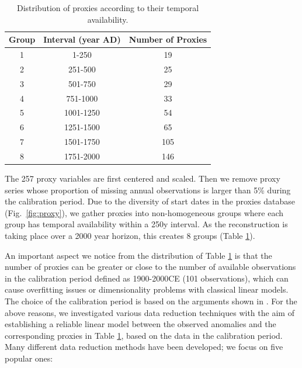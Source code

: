 \documentclass[12pt]{amsart}
\theoremstyle{plain}
\theoremstyle{definition}
\theoremstyle{remark}
\newcommand{\lb}[1]{\color{MidnightBlue}\textbf{[LB: #1]}\normalcolor}
\newcommand{\jeg}[1]{\color{ProcessBlue}\textbf{[JEG: #1]}\normalcolor}
\begin{document}
\begin{table}[h!]
  \centering
  \begin{tabular}{c|c|c}
    \toprule
    Group & Interval (year AD) & Number of Proxies\\
    \midrule
    1 & 1-250 & 19 \\
    2 & 251-500 & 25 \\
    3 & 501-750 & 29 \\
    4 & 751-1000 & 33 \\
    5 & 1001-1250 & 54 \\
    6 & 1251-1500 & 65 \\
    7 & 1501-1750 & 105 \\
    8 & 1751-2000 & 146 \\
    \bottomrule
  \end{tabular}
  \caption{Distribution of proxies according to their temporal availability.}
  \label{tab:distdate}
\end{table}

\vskip -0.7cm
The 257 proxy variables are first centered and scaled. Then we remove
proxy series whose proportion of missing annual observations is larger than 5\%
during the calibration  period.  %
Due to the diversity of start dates in the proxies database (Fig.~\ref{fig:proxy}), we gather proxies into non-homogeneous groups where each group has temporal availability within a 250y interval. As the reconstruction is taking place over a 2000 year
horizon, this creates 8 groups  (Table \ref{tab:distdate}). 

An important aspect we notice from the distribution of Table
\ref{tab:distdate} is that the number of proxies can be greater or 
close to the number of available observations in the calibration period defined as
1900-2000CE (101 observations), which can cause overfitting issues or
dimensionality problems with classical linear models. The choice of the calibration period is based on the
  arguments shown in \cite{Barboza2014}. For the above
reasons, we investigated various data reduction techniques with the aim of establishing 
a reliable linear model between the observed anomalies and the corresponding proxies in
Table \ref{tab:distdate}, based on the data in the calibration
period. Many different data reduction methods have been developed; we focus on five popular ones:  
\end{document}
